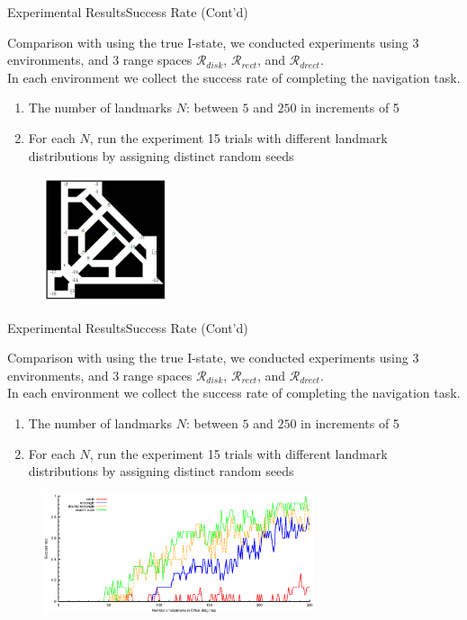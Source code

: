 \documentclass[10pt]{beamer}
\begin{document}
\begin{frame}{Experimental Results}{Success Rate (Cont'd)}
 \small{Comparison with using the true I-state, we conducted experiments using 3
 environments, and 3 range spaces $\mathcal{R}_{disk}$, $\mathcal{R}_{rect}$,
 and  $\mathcal{R}_{drect}$. \\
 In each environment we collect the success rate of completing the navigation
 task. 
 \begin{enumerate}
 \item The number of landmarks $N$: between $5$ and $250$ in increments of 5
 \item For each $N$, run the experiment 15 trials with different landmark
   distributions by assigning distinct random seeds
 \end{enumerate}
}
\begin{figure}
  \centering
  \includegraphics[width=0.33\textwidth]{figs/office}
\end{figure}
\end{frame}

\begin{frame}{Experimental Results}{Success Rate (Cont'd)}
 \small{Comparison with using the true I-state, we conducted experiments using 3
 environments, and 3 range spaces $\mathcal{R}_{disk}$, $\mathcal{R}_{rect}$,
 and  $\mathcal{R}_{drect}$. \\
 In each environment we collect the success rate of completing the navigation
 task. 
 \begin{enumerate}
 \item The number of landmarks $N$: between $5$ and $250$ in increments of 5
 \item For each $N$, run the experiment 15 trials with different landmark
   distributions by assigning distinct random seeds
 \end{enumerate}
}
\begin{figure}
  \centering
  \includegraphics[width=0.71\textwidth]{figs/exp_num_cse}
\end{figure}
\end{frame}
\end{document}
